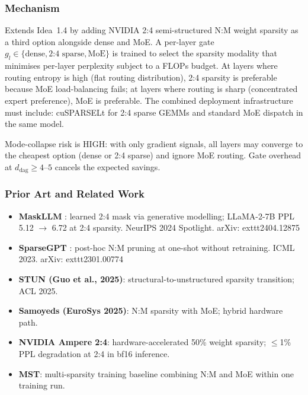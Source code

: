 \documentclass[11pt]{article}
\begin{document}
\subsubsection*{Mechanism}
Extends Idea~1.4 by adding NVIDIA 2:4 semi-structured N:M weight sparsity as a third option alongside dense and MoE.
A per-layer gate $g_l \in \{\text{dense}, \text{2:4 sparse}, \text{MoE}\}$ is trained to select the sparsity modality that minimises per-layer perplexity subject to a FLOPs budget.
At layers where routing entropy is high (flat routing distribution), 2:4 sparsity is preferable because MoE load-balancing fails; at layers where routing is sharp (concentrated expert preference), MoE is preferable.
The combined deployment infrastructure must include: cuSPARSELt for 2:4 sparse GEMMs and standard MoE dispatch in the same model.

Mode-collapse risk is HIGH: with only gradient signals, all layers may converge to the cheapest option (dense or 2:4 sparse) and ignore MoE routing.
Gate overhead at $d_\text{dag} \geq 4$--$5$ cancels the expected savings.

\subsubsection*{Prior Art and Related Work}
\begin{itemize}
  \item \textbf{MaskLLM} \cite{FangEtAl2024}: learned 2:4 mask via generative modelling; LLaMA-2-7B PPL 5.12 $\to$ 6.72 at 2:4 sparsity.
    NeurIPS 2024 Spotlight.
    arXiv:	exttt{2404.12875}

  \item \textbf{SparseGPT} \cite{FrantatAlistarh2023}: post-hoc N:M pruning at one-shot without retraining.
    ICML 2023.
    arXiv:	exttt{2301.00774}

  \item \textbf{STUN (Guo et al., 2025)}: structural-to-unstructured sparsity transition; ACL 2025.

  \item \textbf{Samoyeds (EuroSys 2025)}: N:M sparsity with MoE; hybrid hardware path.

  \item \textbf{NVIDIA Ampere 2:4}: hardware-accelerated 50\% weight sparsity; $\leq$1\% PPL degradation at 2:4 in bf16 inference.

  \item \textbf{MST}: multi-sparsity training baseline combining N:M and MoE within one training run.
\end{itemize}
\end{document}
